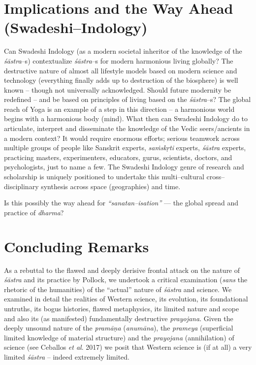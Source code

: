\section*{Implications and the Way Ahead (Swadeshi–Indology)}

Can Swadeshi Indology (as a modern societal inheritor of the knowledge of the \textit{śāstra}–s) contextualize \textit{śāstra}–s for modern harmonious living globally? The destructive nature of almost all lifestyle models based on modern science and technology (everything finally adds up to destruction of the biosphere) is well known – though not universally acknowledged. Should future modernity be redefined – and be based on principles of living based on the \textit{śāstra}–s? The global reach of Yoga is an example of a step in this direction – a harmonious world begins with a harmonious body (mind). What then can Swadeshi Indology do to articulate, interpret and disseminate the knowledge of the Vedic seers/ancients in a modern context? It would require enormous efforts; serious teamwork across multiple groups of people like Sanskrit experts, \textit{saṁskṛti} experts, \textit{śāstra} experts, practicing masters, experimenters, educators, gurus, scientists, doctors, and psychologists, just to name a few. The Swadeshi Indology genre of research and scholarship is uniquely positioned to undertake this multi–cultural cross–disciplinary synthesis across space (geographies) and time.

Is this possibly the way ahead for \textit{“sanatan–isation”} — the global spread and practice of \textit{dharma}?


\section*{Concluding Remarks}

As a rebuttal to the flawed and deeply derisive frontal attack on the nature of \textit{śāstra} and its practice by Pollock, we undertook a critical examination (\textit{sans} the rhetoric of the humanities) of the “actual” nature of \textit{śāstra} and science. We examined in detail the realities of Western science, its evolution, its foundational untruths, its bogus histories, flawed metaphysics, its limited nature and scope and also its (as manifested) fundamentally destructive \textit{prayojana}. Given the deeply unsound nature of the \textit{pramāṇa} (\textit{anumāna}), the \textit{prameya} (superficial limited knowledge of material structure) and the \textit{prayojana} (annihilation) of science (see Ceballos \textit{et al}. 2017) we posit that Western science is (if at all) a very limited \textit{śāstra} – indeed extremely limited.

